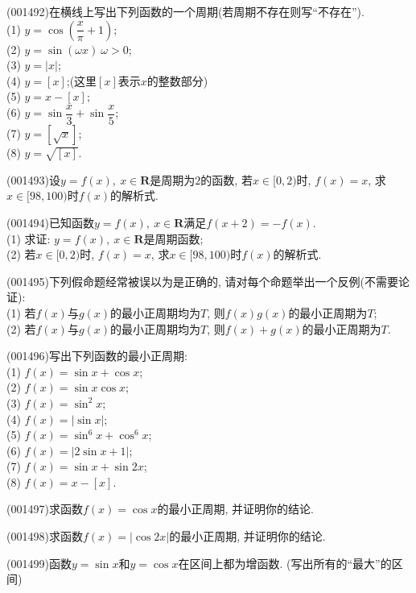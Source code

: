 \item (001492)在横线上写出下列函数的一个周期(若周期不存在则写``不存在'').\\ 
(1) $y=\cos\left(\dfrac x\pi+1\right)$;\\ 
(2) $y=\sin(\omega x)\ \omega>0$;\\ 
(3) $y=|x|$;\\ 
(4) $y=[x]$;(这里$[x]$表示$x$的整数部分)\\ 
(5) $y=x-[x]$;\\ 
(6) $y=\sin\dfrac x3+\sin\dfrac x5$;\\ 
(7) $y=[\sqrt{x}]$;\\ 
(8) $y=\sqrt{[x]}$.
\item (001493)设$y=f(x), \ x\in\mathbf{R}$是周期为$2$的函数, 若$x\in [0,2)$时, $f(x)=x$, 求$x\in [98,100)$时$f(x)$的解析式.
\item (001494)已知函数$y=f(x), \ x\in \mathbf{R}$满足$f(x+2)=-f(x)$.\\ 
(1) 求证: $y=f(x), \ x\in \mathbf{R}$是周期函数;\\ 
(2) 若$x\in [0,2)$时, $f(x)=x$, 求$x\in [98,100)$时$f(x)$的解析式.
\item (001495)下列假命题经常被误以为是正确的, 请对每个命题举出一个反例(不需要论证):\\ 
(1) 若$f(x)$与$g(x)$的最小正周期均为$T$, 则$f(x)g(x)$的最小正周期为$T$;\\ 
(2) 若$f(x)$与$g(x)$的最小正周期均为$T$, 则$f(x)+g(x)$的最小正周期为$T$.
\item (001496)写出下列函数的最小正周期:\\ 
(1) $f(x)=\sin x+\cos x$;\\ 
(2) $f(x)=\sin x\cos x$;\\ 
(3) $f(x)=\sin^2 x$;\\ 
(4) $f(x)=|\sin x|$;\\ 
(5) $f(x)=\sin^6 x+\cos^6 x$;\\ 
(6) $f(x)=|2\sin x+1|$;\\ 
(7) $f(x)=\sin x+\sin 2x$;\\ 
(8) $f(x)=x-[x]$.
\item (001497)求函数$f(x)=\cos x$的最小正周期, 并证明你的结论.
\item (001498)求函数$f(x)=|\cos 2x|$的最小正周期, 并证明你的结论.
\item (001499)函数$y=\sin x$和$y=\cos x$在区间上都为增函数. (写出所有的``最大''的区间)
